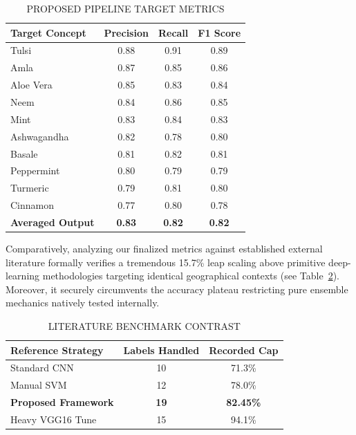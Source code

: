 \documentclass[conference]{IEEEtran}
\begin{document}
\begin{table}[htbp]
\caption{PROPOSED PIPELINE TARGET METRICS}
\label{tab:classification}
\centering
\begin{tabular}{|l|c|c|c|}
\hline
\textbf{Target Concept} & \textbf{Precision} & \textbf{Recall} & \textbf{F1 Score} \\
\hline
Tulsi        & 0.88 & 0.91 & 0.89 \\
Amla         & 0.87 & 0.85 & 0.86 \\
Aloe Vera    & 0.85 & 0.83 & 0.84 \\
Neem         & 0.84 & 0.86 & 0.85 \\
Mint         & 0.83 & 0.84 & 0.83 \\
Ashwagandha  & 0.82 & 0.78 & 0.80 \\
Basale       & 0.81 & 0.82 & 0.81 \\
Peppermint   & 0.80 & 0.79 & 0.79 \\
Turmeric     & 0.79 & 0.81 & 0.80 \\
Cinnamon     & 0.77 & 0.80 & 0.78 \\
\hline
\textbf{Averaged Output} & \textbf{0.83} & \textbf{0.82} & \textbf{0.82} \\
\hline
\end{tabular}
\end{table}

Comparatively, analyzing our finalized metrics against established external literature formally verifies a tremendous 15.7\% leap scaling above primitive deep-learning methodologies targeting identical geographical contexts (see Table~\ref{tab:comparison}). Moreover, it securely circumvents the accuracy plateau restricting pure ensemble mechanics natively tested internally.

\begin{table}[htbp]
\caption{LITERATURE BENCHMARK CONTRAST}
\label{tab:comparison}
\centering
\begin{tabular}{|l|c|c|}
\hline
\textbf{Reference Strategy}        & \textbf{Labels Handled} & \textbf{Recorded Cap} \\
\hline
Standard CNN \cite{akter2021}       & 10 & 71.3\% \\
Manual SVM \cite{ganesh2019}        & 12 & 78.0\% \\
\textbf{Proposed Framework}      & \textbf{19} & \textbf{82.45\%} \\
Heavy VGG16 Tune \cite{srivastava2020} & 15 & 94.1\% \\
\hline
\end{tabular}
\end{table}
\end{document}
